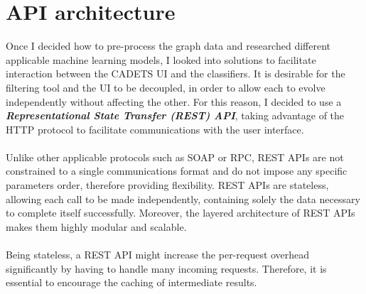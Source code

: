 	\section{API architecture} \label{Section 2.3}
	Once I decided how to pre-process the graph data and researched different applicable machine learning models, I looked into solutions to facilitate interaction between the CADETS UI and the classifiers. It is desirable for the filtering tool and the UI to be decoupled, in order to allow each to evolve independently without affecting the other. For this reason, I decided to use a \textit{\textbf{Representational State Transfer (REST) API}}, taking advantage of the HTTP protocol to facilitate communications with the user interface.
	\\ \\
	Unlike other applicable protocols such as SOAP or RPC, REST APIs are not constrained to a single communications format and do not impose any specific parameters order, therefore providing flexibility. REST APIs are stateless, allowing each call to be made independently, containing solely the data necessary to complete itself successfully. Moreover, the layered architecture of REST APIs makes them highly modular and scalable. 
	\\ \\
	Being stateless, a REST API might increase the per-request overhead significantly by having to handle many incoming requests. Therefore, it is essential to encourage the caching of intermediate results.
	

